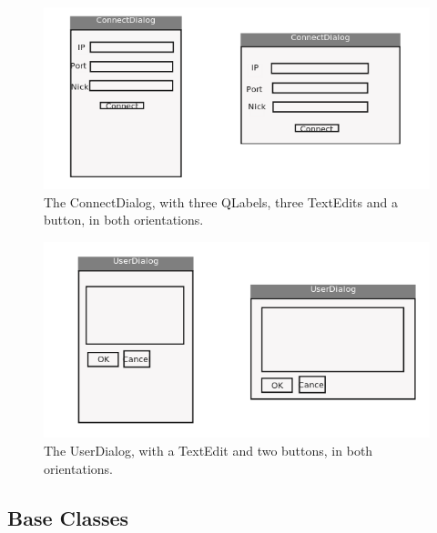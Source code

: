 \documentclass[12pt]{article}
\begin{document}
\begin{figure}[H]
  \centering
     \includegraphics{Figure2.png}
  \caption{The ConnectDialog, with three QLabels, three TextEdits and a button, in both
  orientations.}
\end{figure}

\begin{figure}[H]
  \centering
     \includegraphics{Figure3.png}
  \caption{The UserDialog, with a TextEdit and two buttons, in both
  orientations.}
\end{figure}


\subsection{Base Classes}
\end{document}
